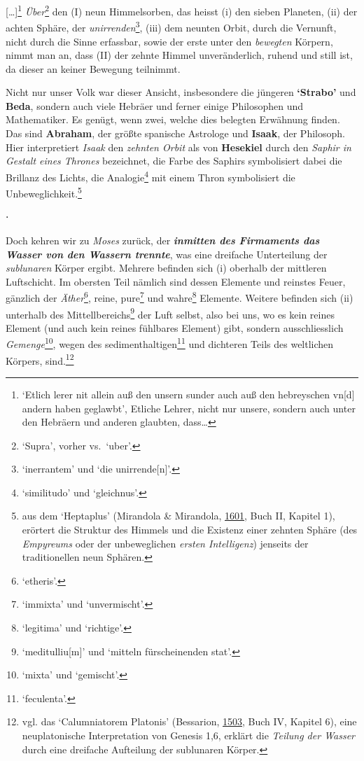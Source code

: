 \documentclass[
]{article}
\begin{document}
{[}\ldots{]}\footnote{`Etlich lerer nit allein auß den unsern sunder
  auch auß den hebreyschen vn{[}d{]} andern haben geglawbt', Etliche
  Lehrer, nicht nur unsere, sondern auch unter den Hebräern und anderen
  glaubten, dass\ldots{}} \emph{Über}\footnote{`Supra', vorher
  vs.~`uber'.} den (I) neun Himmelsorben, das heisst (i) den sieben
Planeten, (ii) der achten Sphäre, der \emph{unirrenden}\footnote{`inerrantem'
  und `die unirrende{[}n{]}'.}, (iii) dem neunten Orbit, durch die
Vernunft, nicht durch die Sinne erfassbar, sowie der erste unter den
\emph{bewegten} Körpern, nimmt man an, dass (II) der zehnte Himmel
unveränderlich, ruhend und still ist, da dieser an keiner Bewegung
teilnimmt.

Nicht nur unser Volk war dieser Ansicht, insbesondere die jüngeren
\textbf{`Strabo'} und \textbf{Beda}, sondern auch viele Hebräer und
ferner einige Philosophen und Mathematiker. Es genügt, wenn zwei, welche
dies belegten Erwähnung finden. Das sind \textbf{Abraham}, der größte
spanische Astrologe und \textbf{Isaak}, der Philosoph. Hier
interpretiert \emph{Isaak} den \emph{zehnten Orbit} als von
\textbf{Hesekiel} durch den \emph{Saphir in Gestalt eines Thrones}
bezeichnet, die Farbe des Saphirs symbolisiert dabei die Brillanz des
Lichts, die Analogie\footnote{`similitudo' und `gleichnus'.} mit einem
Thron symbolisiert die Unbeweglichkeit.\footnote{aus dem `Heptaplus'
  (Mirandola \& Mirandola,
  \href{https://doi.org/10.3931/e-rara-61217}{1601}, Buch II, Kapitel
  1), erörtert die Struktur des Himmels und die Existenz einer zehnten
  Sphäre (des \emph{Empyreums} oder der unbeweglichen \emph{ersten
  Intelligenz}) jenseits der traditionellen neun Sphären.}

⋅

Doch kehren wir zu \emph{Moses} zurück, der \textbf{\emph{inmitten des
Firmaments das Wasser von den Wassern trennte}}, was eine dreifache
Unterteilung der \emph{sublunaren} Körper ergibt. Mehrere befinden sich
(i) oberhalb der mittleren Luftschicht. Im obersten Teil nämlich sind
dessen Elemente und reinstes Feuer, gänzlich der
\emph{Äther}\footnote{`etheris'.}, reine, pure\footnote{`immixta' und
  `unvermischt'.} und wahre\footnote{`legitima' und `richtige'.}
Elemente. Weitere befinden sich (ii) unterhalb des
Mittellbereichs\footnote{`meditulliu{[}m{]}' und `mitteln fürscheinenden
  stat'.} der Luft selbst, also bei uns, wo es kein reines Element (und
auch kein reines fühlbares Element) gibt, sondern ausschliesslich
\emph{Gemenge}\footnote{`mixta' und `gemischt'.}, wegen des
sedimenthaltigen\footnote{`feculenta'.} und dichteren Teils des
weltlichen Körpers, sind.\footnote{vgl. das `Calumniatorem Platonis'
  (Bessarion,
  \href{https://books.google.com/books?id=gPJCAAAAcAAJ}{1503}, Buch IV,
  Kapitel 6), eine neuplatonische Interpretation von Genesis 1,6,
  erklärt die \emph{Teilung der Wasser} durch eine dreifache Aufteilung
  der sublunaren Körper.}
\end{document}
